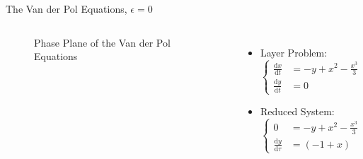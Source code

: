 \documentclass[11pt]{beamer}
\newcommand{\dif}{\mathrm{d}}
\begin{document}
\begin{frame}{The Van der Pol Equations, $\epsilon=0$}
\begin{columns} 
\begin{figure}
    \centering
{}
    \caption{Phase Plane of the Van der Pol Equations}
\end{figure}
\begin{itemize}
  
    \item Layer Problem:
    \begin{equation*}
        \begin{cases}
        \frac{\dif x}{\dif t}&= -y + x^2 - \frac{x^3}{3}\\
        \frac{\dif y}{\dif t}&=0
        \end{cases}
        \end{equation*}

\item Reduced System:
\begin{equation*} 
        \begin{cases}
        0 &= -y + x^2 - \frac{x^3}{3}\\ 
        \frac{\dif y}{\dif\tau}&= (-1+x)
        \end{cases}
        \end{equation*}

\end{itemize}
\end{columns}
\end{frame}
\end{document}
